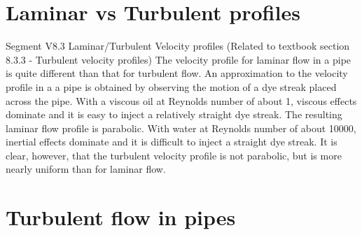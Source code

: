 \documentclass[class=report, crop=false, 12pt,a4paper]{standalone}
\begin{document}
\section{Laminar vs Turbulent profiles}
Segment V8.3 Laminar/Turbulent Velocity profiles (Related to textbook section 8.3.3 - Turbulent velocity profiles) The velocity profile for laminar flow in a pipe is quite different than that for turbulent flow. An approximation to the velocity profile in a a pipe is obtained by observing the motion of a dye streak placed across the pipe. With a viscous oil at Reynolds number of about 1, viscous effects dominate and it is easy to inject a relatively straight dye streak. The resulting laminar flow profile is parabolic. With water at Reynolds number of about 10000, inertial effects dominate and it is difficult to inject a straight dye streak. It is clear, however, that the turbulent velocity profile is not parabolic, but is more nearly uniform than for laminar flow.
\section{Turbulent flow in pipes}
\end{document}

